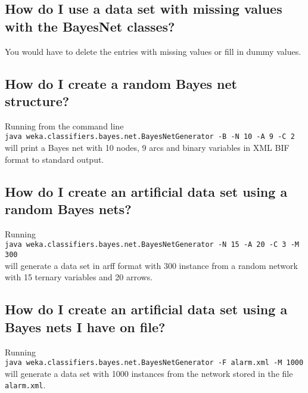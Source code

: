 \documentclass[a4paper]{article}
\begin{document}
\subsection*{How do I use a data set with missing values with the BayesNet classes?}
You would have to delete the entries with missing values or
fill in dummy values.

\subsection*{How do I create a random Bayes net structure?}

Running from the command line \\
{\tt java  weka.classifiers.bayes.net.BayesNetGenerator -B -N 10 -A 9 -C 2}\\
will print a Bayes net with 10 nodes, 9 arcs and binary variables
in XML BIF format to standard output.

\subsection*{How do I create an artificial data set using a random Bayes nets?}
Running\\
{\tt java  weka.classifiers.bayes.net.BayesNetGenerator -N 15 -A 20 -C 3 -M 300}\\
will generate a data set in arff format with 300 instance from a random
network with 15 ternary variables and 20 arrows.

\subsection*{How do I create an artificial data set using a Bayes nets I have on file?}
Running\\
{\tt java  weka.classifiers.bayes.net.BayesNetGenerator -F alarm.xml -M 1000}\\
will generate a data set with 1000 instances from the network stored in the file
{\tt alarm.xml}.
\end{document}
